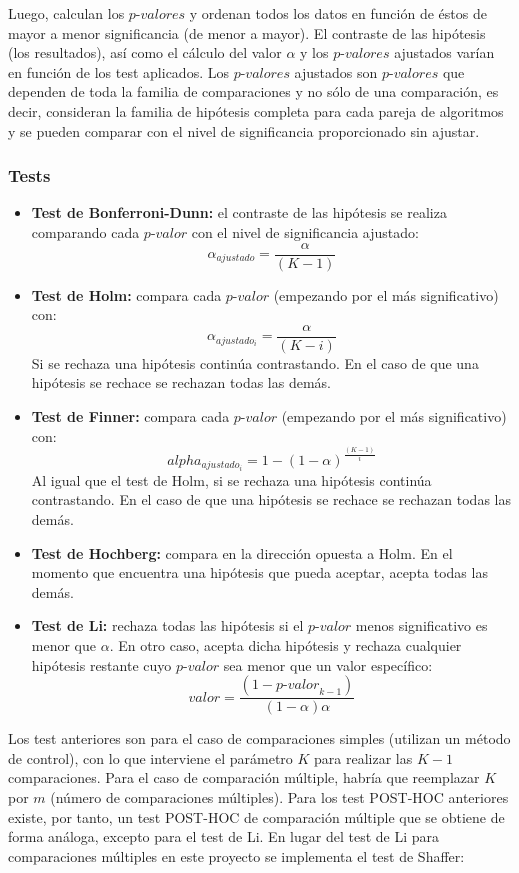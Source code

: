 Luego, calculan los $\textit{p-valor}es$ y ordenan todos los datos en función de éstos de mayor a menor 
significancia (de menor a mayor). El contraste de las hipótesis (los resultados), así como el cálculo del valor
$\alpha$ y los $\textit{p-valor}es$ ajustados varían en función de los test aplicados. Los $\textit{p-valor}es$
ajustados son $\textit{p-valor}es$ que dependen de toda la familia de comparaciones y no sólo de una comparación,
es decir, consideran la familia de hipótesis completa para cada pareja de algoritmos y se pueden comparar con el
nivel de significancia proporcionado sin ajustar.

\subsubsection{Tests}
\begin{itemize}
\item \textbf{Test de Bonferroni-Dunn:} el contraste de las hipótesis se realiza comparando cada $\textit{p-valor}$ con
el nivel de significancia ajustado:
\[ \alpha_{ajustado} = \frac{\alpha}{(K-1)} \]
\item \textbf{Test de Holm:} compara cada $\textit{p-valor}$ (empezando por el más significativo) con:
\[ \alpha_{ajustado_i} = \frac{\alpha}{(K-i)} \]
Si se rechaza una hipótesis continúa contrastando. En el caso de que una hipótesis se rechace se rechazan todas
las demás.
\item \textbf{Test de Finner:} compara cada $\textit{p-valor}$ (empezando por el más significativo) con:
\[ alpha_{ajustado_i} = 1-(1-\alpha)^{\frac{(K-1)}{i}} \]
Al igual que el test de Holm, si se rechaza una hipótesis continúa contrastando. En el caso de que una hipótesis
se rechace se rechazan todas
las demás.
\item \textbf{Test de Hochberg:} compara en la dirección opuesta a Holm. En el momento que encuentra una hipótesis
que pueda aceptar, acepta todas las demás.
\item \textbf{Test de Li:} rechaza todas las hipótesis si el $\textit{p-valor}$ menos significativo es menor que  $\alpha$.
En otro caso, acepta dicha hipótesis y rechaza cualquier hipótesis restante cuyo $\textit{p-valor}$ sea menor que un valor
específico:
\[ valor = \frac{(1-\textit{p-valor}_{k-1})}{(1-\alpha)\alpha} \]
\end{itemize}

Los test anteriores son para el caso de comparaciones simples (utilizan un método de control), con lo que
interviene el parámetro $K$ para realizar las $K-1$ comparaciones. Para el caso de comparación múltiple, habría
que reemplazar $K$ por $m$ (número de comparaciones múltiples). Para los test POST-HOC anteriores existe, por
tanto, un test POST-HOC de comparación múltiple que se obtiene de forma análoga, excepto para el test de Li. En
lugar del test de Li para comparaciones múltiples en este proyecto se implementa el test de Shaffer:


